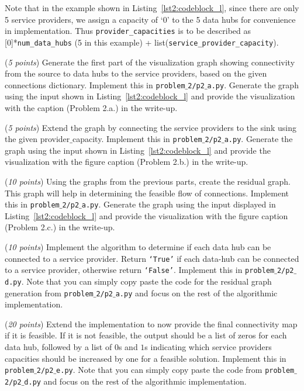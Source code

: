 \documentclass{hw}
\begin{document}
\begin{problem}
Note that in the example shown in Listing~\ref{lst2:codeblock_l}, since there are only 5 service providers, we assign a capacity of `0' to the 5 data hubs for convenience in implementation. Thus \texttt{provider\_capacities} is to be described as [0]*\texttt{num\_data\_hubs} (5 in this example) + list(\texttt{service\_provider\_capacity}).

\begin{subproblem}
(\textit{5 points}) Generate the first part of the visualization graph showing connectivity from the source to data hubs to the service providers, based on the given connections dictionary. Implement this in \texttt{problem$\_$2/p2$\_$a.py}. Generate the graph using the input shown in Listing~\ref{lst2:codeblock_l} and provide the visualization with the caption (Problem 2.a.) in the write-up.
\end{subproblem}

\begin{subproblem}
(\textit{5 points}) Extend the graph by connecting the service providers to the sink using the given provider$\_$capacity. Implement this in \texttt{problem$\_$2/p2$\_$a.py}. Generate the graph using the input shown in Listing~\ref{lst2:codeblock_l} and provide the visualization with the figure caption (Problem 2.b.) in the write-up.
\end{subproblem}

\begin{subproblem}
(\textit{10 points}) Using the graphs from the previous parts, create the residual graph. This graph will help in determining the feasible flow of connections. Implement this in \linebreak \texttt{problem$\_$2/p2$\_$a.py}. Generate the graph using the input displayed in Listing~\ref{lst2:codeblock_l} and provide the visualization with the figure caption (Problem 2.c.) in the write-up.
\end{subproblem}

\begin{subproblem}
(\textit{10 points})
Implement the algorithm to determine if each data hub can be connected to a service provider. Return \texttt{`True'} if each data-hub can be connected to a service provider, otherwise return \texttt{`False'}. Implement this in \texttt{problem$\_$2/p2$\_$d.py}. Note that you can simply copy paste the code for the residual graph generation from \texttt{problem$\_$2/p2$\_$a.py} and focus on the rest of the algorithmic implementation.
\end{subproblem}

\begin{subproblem}
(\textit{20 points})
Extend the implementation to now provide the final connectivity map if it is feasible. If it is not feasible, the output should be a list of zeros for each data hub, followed by a list of $0$s and $1$s indicating which service providers capacities should be increased by one for a feasible solution. Implement this in \texttt{problem$\_$2/p2$\_$e.py}. Note that you can simply copy paste the code from \texttt{problem$\_$2/p2$\_$d.py} and focus on the rest of the algorithmic implementation.
\end{subproblem}


\end{problem}
\end{document}
